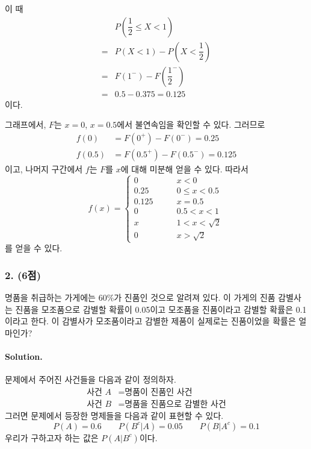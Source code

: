 이 때
\begin{align*}
	& P\left(\dfrac{1}{2} \leq X < 1\right)\\
	=& P\left(X < 1\right) - P\left(X < \dfrac{1}{2}\right) \\
	=& F\left(1^-\right) - F\left(\dfrac{1}{2}^-\right)\\
	=& 0.5-0.375 = 0.125
\end{align*}
이다.

그래프에서, $F$는 $x = 0$, $x = 0.5$에서 불연속임을 확인할 수 있다. 그러므로
\begin{align*}
	f\left(0\right) &= F\left(0^+\right) - F\left(0^-\right) = 0.25 \\
	f\left(0.5\right) &= F\left(0.5^+\right) - F\left(0.5^-\right) = 0.125
\end{align*}
이고, 나머지 구간에서 $f$는 $F$를 $x$에 대해 미분해 얻을 수 있다. 따라서
\[f\left(x\right) = \left\{
\begin{array}{ll}
	0 				& \qquad x < 0 \\
	0.25		 	& \qquad 0 \leq x < 0.5 \\
	0.125		 	& \qquad x = 0.5 \\
	0 				& \qquad 0.5 < x < 1 \\
	x				& \qquad 1 < x < \sqrt{2} \\
	0 				& \qquad x > \sqrt{2}
\end{array}
\right. \]
를 얻을 수 있다.

\subsubsection{2. (6점)} 명품을 취급하는 가게에는 60\%가 진품인 것으로 알려져 있다. 이 가게의 진품 감별사는 진품을 모조품으로 감별할 확률이 0.05이고 모조품을 진품이라고 감별할
확률은 0.1이라고 한다. 이 감별사가 모조품이라고 감별한 제품이 실제로는 진품이었을 확률은 얼마인가?

\paragraph{Solution.} 문제에서 주어진 사건들을 다음과 같이 정의하자.
\begin{align*}
	\textrm{사건 }A &= \textrm{명품이 진품인 사건} \\
	\textrm{사건 }B &= \textrm{명품을 진품으로 감별한 사건}
\end{align*}
그러면 문제에서 등장한 명제들을 다음과 같이 표현할 수 있다.
\[P\left(A\right) = 0.6 \qquad P\left(B^c|A\right) = 0.05 \qquad P\left(B|A^c\right) = 0.1\]
우리가 구하고자 하는 값은 $P\left(A|B^c\right)$이다.

